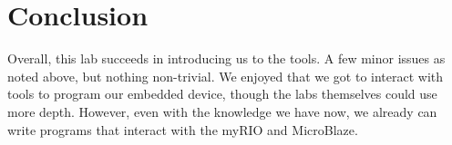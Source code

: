 \documentclass[10pt]{article}
\begin{document}
\section*{Conclusion}
    Overall, this lab succeeds in introducing us to the tools. A few minor issues as noted above, but nothing non-trivial. We enjoyed that we got to interact with tools to program our embedded device, though the labs themselves could use more depth. However, even with the knowledge we have now, we already can write programs that interact with the myRIO and MicroBlaze.
\end{document}
